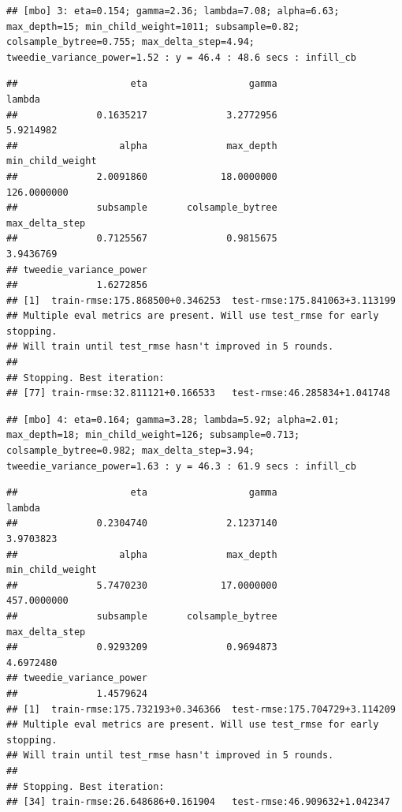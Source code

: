 \documentclass[
]{article}
\begin{document}
\begin{verbatim}
## [mbo] 3: eta=0.154; gamma=2.36; lambda=7.08; alpha=6.63; max_depth=15; min_child_weight=1011; subsample=0.82; colsample_bytree=0.755; max_delta_step=4.94; tweedie_variance_power=1.52 : y = 46.4 : 48.6 secs : infill_cb
\end{verbatim}

\begin{verbatim}
##                    eta                  gamma                 lambda 
##              0.1635217              3.2772956              5.9214982 
##                  alpha              max_depth       min_child_weight 
##              2.0091860             18.0000000            126.0000000 
##              subsample       colsample_bytree         max_delta_step 
##              0.7125567              0.9815675              3.9436769 
## tweedie_variance_power 
##              1.6272856 
## [1]  train-rmse:175.868500+0.346253  test-rmse:175.841063+3.113199 
## Multiple eval metrics are present. Will use test_rmse for early stopping.
## Will train until test_rmse hasn't improved in 5 rounds.
## 
## Stopping. Best iteration:
## [77] train-rmse:32.811121+0.166533   test-rmse:46.285834+1.041748
\end{verbatim}

\begin{verbatim}
## [mbo] 4: eta=0.164; gamma=3.28; lambda=5.92; alpha=2.01; max_depth=18; min_child_weight=126; subsample=0.713; colsample_bytree=0.982; max_delta_step=3.94; tweedie_variance_power=1.63 : y = 46.3 : 61.9 secs : infill_cb
\end{verbatim}

\begin{verbatim}
##                    eta                  gamma                 lambda 
##              0.2304740              2.1237140              3.9703823 
##                  alpha              max_depth       min_child_weight 
##              5.7470230             17.0000000            457.0000000 
##              subsample       colsample_bytree         max_delta_step 
##              0.9293209              0.9694873              4.6972480 
## tweedie_variance_power 
##              1.4579624 
## [1]  train-rmse:175.732193+0.346366  test-rmse:175.704729+3.114209 
## Multiple eval metrics are present. Will use test_rmse for early stopping.
## Will train until test_rmse hasn't improved in 5 rounds.
## 
## Stopping. Best iteration:
## [34] train-rmse:26.648686+0.161904   test-rmse:46.909632+1.042347
\end{verbatim}
\end{document}
